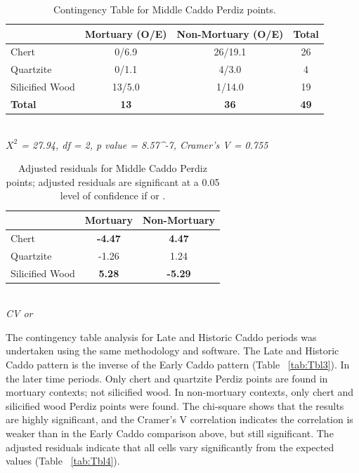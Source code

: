 \documentclass[review]{elsarticle}
\begin{document}
\begin{table}[tbh]\centering
\footnotesize
\caption{Contingency Table for Middle Caddo Perdiz points.}
\centering
\begin{tabular}{lccc}
\hline
 & Mortuary (O/E) & Non-Mortuary (O/E) & Total\\
\hline
Chert & 0/6.9 & 26/19.1 & 26\\
Quartzite & 0/1.1 & 4/3.0 & 4\\
Silicified Wood & 13/5.0 & 1/14.0 & 19\\
\hline
\textbf{Total} & \textbf{13} & \textbf{36} & \textbf{49}\\
\hline
\end{tabular}\\
\textit{$X^{2}$ = 27.94, df = 2, p value = 8.57^{-7}, Cramer’s V = 0.755}
\label{tab:Tbl1}
\end{table}

\begin{table}[tbh]\centering
\footnotesize
\caption{Adjusted residuals for Middle Caddo Perdiz points; adjusted residuals are significant at a 0.05 level of confidence if \textbf{} or \textbf{}.}
\centering
\begin{tabular}{lcc}
\hline
 & Mortuary & Non-Mortuary\\
\hline
Chert & \textbf{-4.47} & \textbf{4.47}\\
Quartzite & -1.26 & 1.24\\
Silicified Wood & \textbf{5.28} & \textbf{-5.29}\\
\hline
\end{tabular}\\
\textit{CV  or }
\label{tab:Tbl2}
\end{table}

The contingency table analysis for Late and Historic Caddo periods was undertaken using the same methodology and software. The Late and Historic Caddo pattern is the inverse of the Early Caddo pattern (Table ~\ref{tab:Tbl3}). In the later time periods. Only chert and quartzite Perdiz points are found in mortuary contexts; not silicified wood. In non-mortuary contexts, only chert and silicified wood Perdiz points were found. The chi-square shows that the results are highly significant, and the Cramer’s V correlation indicates the correlation is weaker than in the Early Caddo comparison above, but still significant. The adjusted residuals indicate that all cells vary significantly from the expected values (Table ~\ref{tab:Tbl4}).
\end{document}

